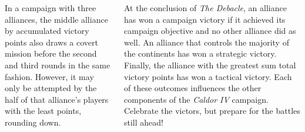 \begin{columns}
In a campaign with three alliances, the middle alliance by accumulated
victory points also draws a covert mission before the second and third
rounds in the same fashion.  However, it may only be attempted by the
half of that alliance's players with the least points, rounding down.



At the conclusion of \emph{The Debacle}, an alliance has won a
campaign victory if it achieved its campaign objective and no other
alliance did as well.  An alliance that controls the majority of the
continents has won a strategic victory.  Finally, the alliance with
the greatest sum total victory points has won a tactical victory.
Each of these outcomes influences the other components of the
\emph{Caldor IV} campaign.  Celebrate the victors, but prepare for the
battles still ahead!

\end{columns}

\pagebreak
\squelchbackground

